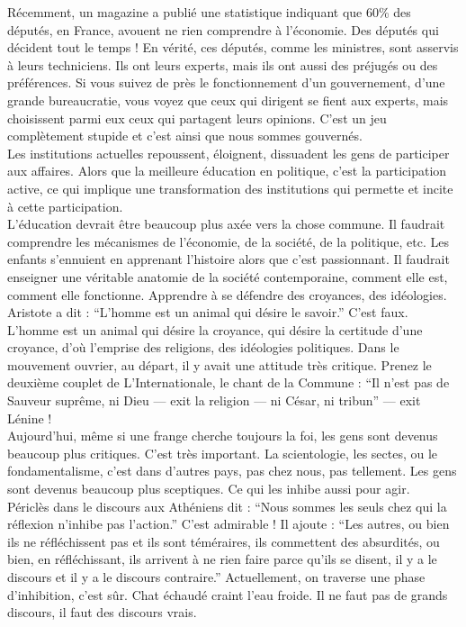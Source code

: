 Récemment, un magazine a publié une statistique indiquant que 60\% des députés, en France, avouent ne rien comprendre à l’économie. Des députés qui décident tout le temps ! En vérité, ces députés, comme les ministres, sont asservis à leurs techniciens. Ils ont leurs experts, mais ils ont aussi des préjugés ou des préférences. Si vous suivez de près le fonctionnement d’un gouvernement, d’une grande bureaucratie, vous voyez que ceux qui dirigent se fient aux experts, mais choisissent parmi eux ceux qui partagent leurs opinions. C’est un jeu complètement stupide et c’est ainsi que nous sommes gouvernés.\\
Les institutions actuelles repoussent, éloignent, dissuadent les gens de participer aux affaires. Alors que la meilleure éducation en politique, c’est la participation active, ce qui implique une transformation des institutions qui permette et incite à cette participation.\\
L’éducation devrait être beaucoup plus axée vers la chose commune. Il faudrait comprendre les mécanismes de l’économie, de la société, de la politique, etc. Les enfants s’ennuient en apprenant l’histoire alors que c’est passionnant. Il faudrait enseigner une véritable anatomie de la société contemporaine, comment elle est, comment elle fonctionne. Apprendre à se défendre des croyances, des idéologies.\\
Aristote a dit : ``L’homme est un animal qui désire le savoir.'' C’est faux. L’homme est un animal qui désire la croyance, qui désire la certitude d’une croyance, d’où l’emprise des religions, des idéologies politiques. Dans le mouvement ouvrier, au départ, il y avait une attitude très critique. Prenez le deuxième couplet de L’Internationale, le chant de la Commune : ``Il n’est pas de Sauveur suprême, ni Dieu --- exit la religion --- ni César, ni tribun'' --- exit Lénine !\\
Aujourd’hui, même si une frange cherche toujours la foi, les gens sont devenus beaucoup plus critiques. C’est très important. La scientologie, les sectes, ou le fondamentalisme, c’est dans d’autres pays, pas chez nous, pas tellement. Les gens sont devenus beaucoup plus sceptiques. Ce qui les inhibe aussi pour agir.\\
Périclès dans le discours aux Athéniens dit : ``Nous sommes les seuls chez qui la réflexion n’inhibe pas l’action.'' C’est admirable ! Il ajoute : ``Les autres, ou bien ils ne réfléchissent pas et ils sont téméraires, ils commettent des absurdités, ou bien, en réfléchissant, ils arrivent à ne rien faire parce qu’ils se disent, il y a le discours et il y a le discours contraire.'' Actuellement, on traverse une phase d’inhibition, c’est sûr. Chat échaudé craint l’eau froide. Il ne faut pas de grands discours, il faut des discours vrais.\\
